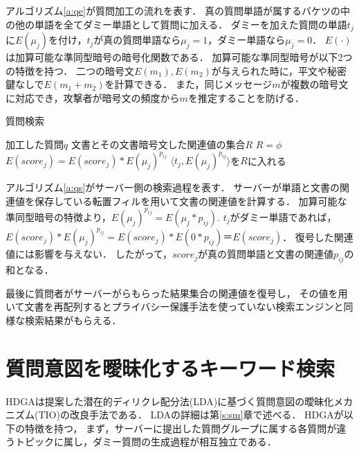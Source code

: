 \documentclass[master]{suribt}
\theoremstyle{definition}
\begin{document}
 アルゴリズム\ref{a:qe}が質問加工の流れを表す．
 真の質問単語が属するバケツの中の他の単語を全てダミー単語として質問に加える．
 ダミーを加えた質問の単語$t_j$に$E(\mu_j)$を付け，$t_j$が真の質問単語なら$\mu_j=1$，ダミー単語なら$\mu_j=0$．
 $E(\cdot)$は加算可能な準同型暗号\cite{dpe1994}の暗号化関数である．
 加算可能な準同型暗号が以下2つの特徴を持つ．
 二つの暗号文$E(m_1), E(m_2)$が与えられた時に，平文や秘密鍵なしで$E( m_1 + m_2 )$を計算できる．
 また，同じメッセージ$m$が複数の暗号文に対応でき，攻撃者が暗号文の頻度から$m$を推定することを防げる．

 \begin{algorithm}
 \caption{質問検索}
 \begin{algorithmic}[1]
  \Require 加工した質問$q$
  \Ensure 文書とその文書暗号文した関連値の集合$R$
  \State $R=\phi$
     \State $E(score_j)=E(score_j)*E(\mu_j)^{p_{ij}}$
    \Else
     \State $\langle t_j,E(\mu_j)^{p_{ij}}\rangle$を$R$に入れる
    \EndIf
   \EndFor
  \EndFor
 \EndFunction
 \end{algorithmic}
 \label{a:qs}
 \end{algorithm}

 アルゴリズム\ref{a:qs}がサーバー側の検索過程を表す．
 サーバーが単語と文書の関連値を保存している転置フィルを用いて文書の関連値を計算する．
 加算可能な準同型暗号の特徴より，$E(\mu_j)^{p_{ij}}=E(\mu_j*p_{ij})$.
 $t_j$がダミー単語であれば，$E(score_j)*E(\mu_j)^{p_{ij}}=E(score_j)*E(0*p_{ij})＝E(score_j)$．
 復号した関連値には影響を与えない．
 したがって，$score_j$が真の質問単語と文書の関連値$p_{ij}$の和となる．

 最後に質問者がサーバーがらもらった結果集合の関連値を復号し，
 その値を用いて文書を再配列するとプライバシー保護手法を使っていない検索エンジンと同様な検索結果がもらえる．

 \section{質問意図を曖昧化するキーワード検索}

 HDGAは\cite{oti2012}提案した潜在的ディリクレ配分法(LDA)\cite{lda2003}に基づく質問意図の曖昧化メカニズム(TIO)の改良手法である．
 LDAの詳細は第\ref{s:sm}章で述べる．
 HDGAが以下の特徴を持つ，
 まず，サーバーに提出した質問グループに属する各質問が違うトピックに属し，ダミー質問の生成過程が相互独立である．
\end{document}

